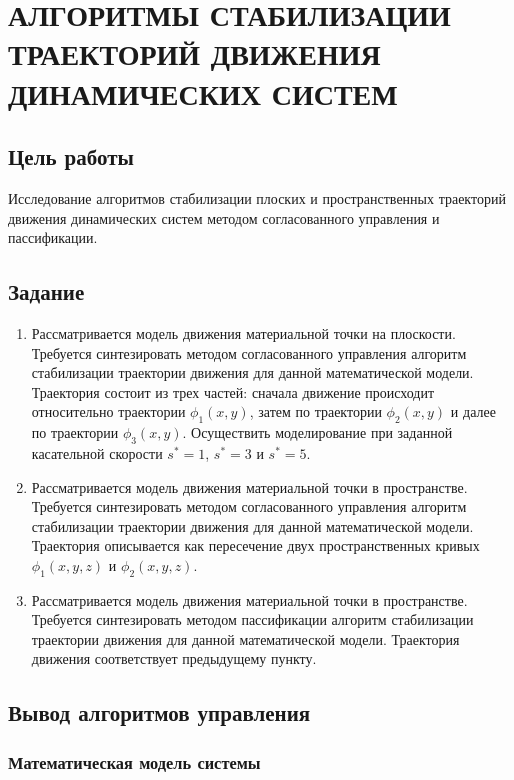 \chapter{АЛГОРИТМЫ СТАБИЛИЗАЦИИ ТРАЕКТОРИЙ ДВИЖЕНИЯ ДИНАМИЧЕСКИХ СИСТЕМ}

\section{Цель работы}

Исследование алгоритмов стабилизации плоских и пространственных траекторий движения динамических систем методом согласованного управления и пассификации.

\section{Задание}

\begin{enumerate}
\item Рассматривается модель движения материальной точки на плоскости. Требуется синтезировать методом согласованного управления алгоритм стабилизации траектории движения для данной математической модели. Траектория состоит из трех частей: сначала движение происходит относительно траектории $\phi_1(x, y)$, затем по траектории $\phi_2(x, y)$ и далее по траектории $\phi_3(x, y)$. Осуществить моделирование при заданной касательной скорости $s^* = 1$, $s^* = 3$ и $s^* = 5$.

\item Рассматривается модель движения материальной точки в пространстве. Требуется синтезировать методом согласованного управления алгоритм стабилизации траектории движения для данной математической модели. Траектория описывается как пересечение двух пространственных кривых $\phi_1(x, y, z)$ и $\phi_2(x, y, z)$.

\item Рассматривается модель движения материальной точки в пространстве. Требуется синтезировать методом пассификации алгоритм стабилизации траектории движения для данной математической модели. Траектория движения соответствует предыдущему пункту.
\end{enumerate}

\section{Вывод алгоритмов управления}

\subsection{Математическая модель системы}

